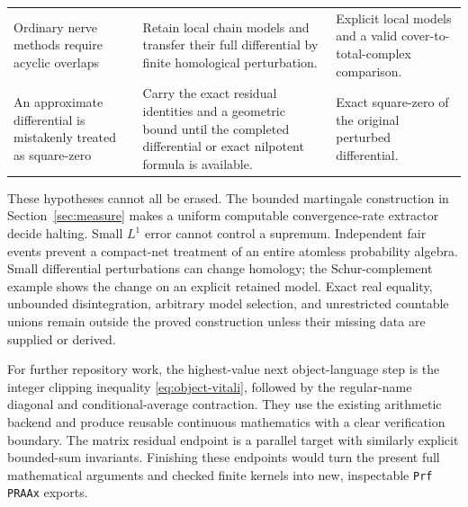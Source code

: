 \begin{longtable}{@{}p{}p{}p{}@{}}
Ordinary nerve methods require acyclic overlaps & Retain local chain models and transfer their full differential by finite homological perturbation. & Explicit local models and a valid cover-to-total-complex comparison.\\
An approximate differential is mistakenly treated as square-zero & Carry the exact residual identities and a geometric bound until the completed differential or exact nilpotent formula is available. & Exact square-zero of the original perturbed differential.\\
\bottomrule
\end{longtable}

These hypotheses cannot all be erased. The bounded martingale construction
in Section~\ref{sec:measure} makes a uniform computable convergence-rate
extractor decide halting. Small $L^1$ error cannot control a supremum.
Independent fair events prevent a compact-net treatment of an entire
atomless probability algebra. Small differential perturbations can change
homology; the Schur-complement example shows the change on an explicit
retained model. Exact real equality, unbounded disintegration, arbitrary
model selection, and unrestricted countable unions remain outside the
proved construction unless their missing data are supplied or derived.

For further repository work, the highest-value next object-language step
is the integer clipping inequality \eqref{eq:object-vitali}, followed by
the regular-name diagonal and conditional-average contraction. They use
the existing arithmetic backend and produce reusable continuous mathematics
with a clear verification boundary. The matrix residual endpoint is a
parallel target with similarly explicit bounded-sum invariants. Finishing
these endpoints would turn the present full mathematical arguments and
checked finite kernels into new, inspectable \texttt{Prf PRAAx} exports.
